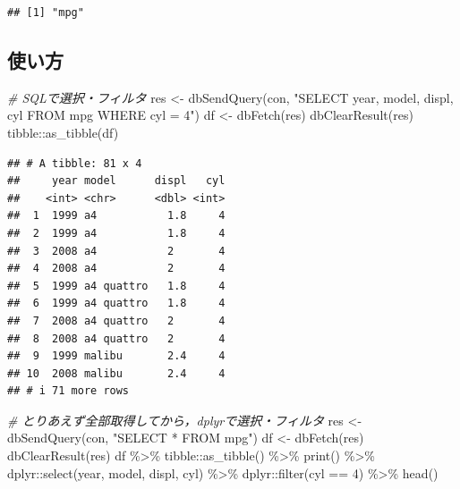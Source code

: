 \documentclass[
]{article}
\newenvironment{Shaded}{\begin{snugshade}}{\end{snugshade}}
\newcommand{\CommentTok}[1]{\textcolor[rgb]{0.56,0.35,0.01}{\textit{#1}}}
\newcommand{\DecValTok}[1]{\textcolor[rgb]{0.00,0.00,0.81}{#1}}
\newcommand{\FunctionTok}[1]{\textcolor[rgb]{0.00,0.00,0.00}{#1}}
\newcommand{\NormalTok}[1]{#1}
\newcommand{\OtherTok}[1]{\textcolor[rgb]{0.56,0.35,0.01}{#1}}
\newcommand{\SpecialCharTok}[1]{\textcolor[rgb]{0.00,0.00,0.00}{#1}}
\newcommand{\StringTok}[1]{\textcolor[rgb]{0.31,0.60,0.02}{#1}}
\begin{document}
\begin{verbatim}
## [1] "mpg"
\end{verbatim}

\hypertarget{ux4f7fux3044ux65b9-3}{%
\subsection{使い方}\label{ux4f7fux3044ux65b9-3}}

\begin{Shaded}
\begin{Highlighting}[]
  \CommentTok{\# SQLで選択・フィルタ}
\NormalTok{res }\OtherTok{\textless{}{-}} \FunctionTok{dbSendQuery}\NormalTok{(con, }\StringTok{"SELECT year, model, displ, cyl FROM mpg WHERE cyl = 4"}\NormalTok{)}
\NormalTok{df }\OtherTok{\textless{}{-}} \FunctionTok{dbFetch}\NormalTok{(res)}
\FunctionTok{dbClearResult}\NormalTok{(res)}
\NormalTok{tibble}\SpecialCharTok{::}\FunctionTok{as\_tibble}\NormalTok{(df)}
\end{Highlighting}
\end{Shaded}

\begin{verbatim}
## # A tibble: 81 x 4
##     year model      displ   cyl
##    <int> <chr>      <dbl> <int>
##  1  1999 a4           1.8     4
##  2  1999 a4           1.8     4
##  3  2008 a4           2       4
##  4  2008 a4           2       4
##  5  1999 a4 quattro   1.8     4
##  6  1999 a4 quattro   1.8     4
##  7  2008 a4 quattro   2       4
##  8  2008 a4 quattro   2       4
##  9  1999 malibu       2.4     4
## 10  2008 malibu       2.4     4
## # i 71 more rows
\end{verbatim}

\begin{Shaded}
\begin{Highlighting}[]
  \CommentTok{\# とりあえず全部取得してから，dplyrで選択・フィルタ}
\NormalTok{res }\OtherTok{\textless{}{-}} \FunctionTok{dbSendQuery}\NormalTok{(con, }\StringTok{"SELECT * FROM mpg"}\NormalTok{)}
\NormalTok{df }\OtherTok{\textless{}{-}} \FunctionTok{dbFetch}\NormalTok{(res)}
\FunctionTok{dbClearResult}\NormalTok{(res)}
\NormalTok{df }\SpecialCharTok{\%\textgreater{}\%}
\NormalTok{  tibble}\SpecialCharTok{::}\FunctionTok{as\_tibble}\NormalTok{() }\SpecialCharTok{\%\textgreater{}\%}
  \FunctionTok{print}\NormalTok{() }\SpecialCharTok{\%\textgreater{}\%}
\NormalTok{  dplyr}\SpecialCharTok{::}\FunctionTok{select}\NormalTok{(year, model, displ, cyl) }\SpecialCharTok{\%\textgreater{}\%}
\NormalTok{  dplyr}\SpecialCharTok{::}\FunctionTok{filter}\NormalTok{(cyl }\SpecialCharTok{==} \DecValTok{4}\NormalTok{) }\SpecialCharTok{\%\textgreater{}\%}
  \FunctionTok{head}\NormalTok{()}
\end{Highlighting}
\end{Shaded}
\end{document}
